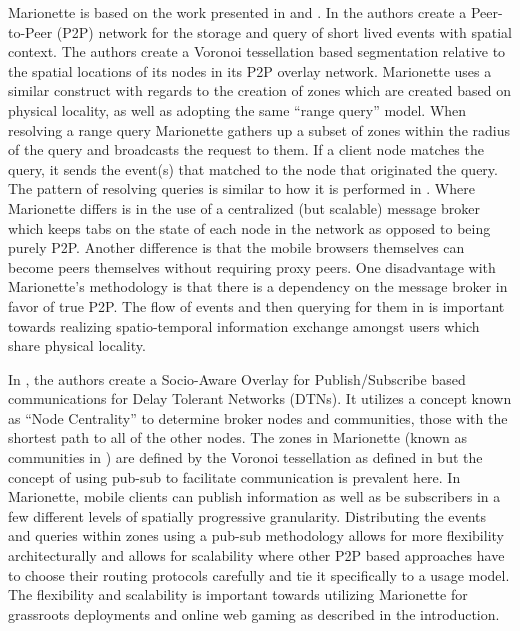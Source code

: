 \documentclass[12pt]{report}	%
\theoremstyle{definition}
\theoremstyle{remark}
\begin{document}
Marionette is based on the work presented in
\cite{zio2011p2p} and
\cite{yoneki2007socio}. In
\cite{zio2011p2p} the authors create a Peer-to-Peer
(P2P) network for the storage and query of short lived events with
spatial context. The authors create a Voronoi tessellation based
segmentation relative to the spatial locations of its nodes in its P2P
overlay network. Marionette uses a similar construct with regards to the
creation of zones which are created based on physical locality, as well
as adopting the same ``range query'' model. When resolving a range query
Marionette gathers up a subset of zones within the radius of the query
and broadcasts the request to them. If a client node matches the query,
it sends the event(s) that matched to the node that originated the
query. The pattern of resolving queries is similar to how it is
performed in \cite{zio2011p2p}. Where Marionette
differs is in the use of a centralized (but scalable) message broker
which keeps tabs on the state of each node in the network as opposed to
being purely P2P. Another difference is that the mobile browsers
themselves can become peers themselves without requiring proxy peers.
One disadvantage with Marionette's methodology is that there is a
dependency on the message broker in favor of true P2P. The flow of
events and then querying for them in \cite{zio2011p2p}
is important towards realizing spatio-temporal information exchange
amongst users which share physical locality.

In \cite{yoneki2007socio}, the authors create a
Socio-Aware Overlay for Publish/Subscribe based communications for Delay
Tolerant Networks (DTNs). It utilizes a concept known as ``Node
Centrality'' to determine broker nodes and communities, those with the
shortest path to all of the other nodes. The zones in Marionette (known
as communities in \cite{yoneki2007socio}) are defined
by the Voronoi tessellation as defined in
\cite{zio2011p2p} but the concept of using pub-sub to
facilitate communication is prevalent here. In Marionette, mobile
clients can publish information as well as be subscribers in a few
different levels of spatially progressive granularity. Distributing the
events and queries within zones using a pub-sub methodology allows for
more flexibility architecturally and allows for scalability where other
P2P based approaches have to choose their routing protocols carefully
and tie it specifically to a usage model. The flexibility and
scalability is important towards utilizing Marionette for grassroots
deployments and online web gaming as described in the introduction.
\end{document}
